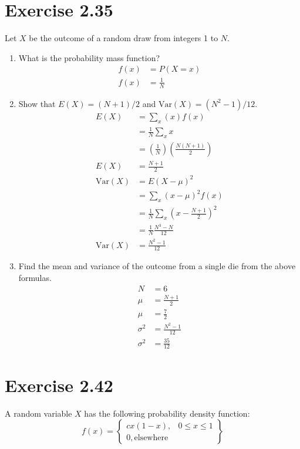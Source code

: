 \documentclass{article}
\newcommand{\var}{\text{Var}}
\begin{document}
\section*{Exercise 2.35}
Let $X$ be the outcome of a random draw from integers 1 to $N$.
\begin{enumerate}
	\item What is the probability mass function?
	\begin{align*}
		f(x) &= P(X=x)\\
		f(x) &= \frac{1}{N}
	\end{align*}
	\item Show that $E(X) = (N+1)/2$ and $\var(X) = (N^2-1)/12$.
	\begin{align*}
		E(X) &= \sum_x (x)f(x)\\
		&= \frac{1}{N} \sum_x x\\
		&= \left( \frac{1}{N} \right)\left( \frac{N(N+1)}{2} \right)\\
		E(X) &= \frac{N+1}{2}\\
		\var(X) &= E(X-\mu)^2\\
		&= \sum_x (x-\mu)^2 f(x)\\
		&= \frac{1}{N} \sum_x \left(x-\frac{N+1}{2}\right)^2\\
		&= \frac{1}{N} \frac{N^3-N}{12}\\
		\var(X) &= \frac{N^2-1}{12}
	\end{align*}
	\item Find the mean and variance of the outcome from a single die from the above formulas.
	\begin{align*}
		N &= 6\\
		\mu &= \frac{N+1}{2}\\
		\mu &= \frac{7}{2}\\
		\sigma^2 &= \frac{N^2-1}{12} \\
		\sigma^2 &= \frac{35}{12}
	\end{align*}
\end{enumerate}
\newpage
\section*{Exercise 2.42}
A random variable $X$ has the following probability density function:
\[ f(x) = 
	\left\{ \begin{array}{ll}
		cx(1-x), & 0 \leq x \le 1\\
		0, \text{elsewhere}
	\end{array} \right\} \]
	
\end{document}
